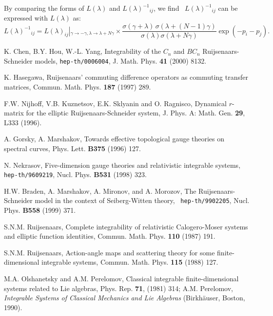 \documentclass[a4paper,12pt]{article}
\begin{document}
By comparing the forms of $L(\lambda )$ and $L(\lambda
)^{-1}{}_{ij}$, we find \ $L(\lambda )^{-1}{}_{ij}$ can be
expressed with $L(\lambda )$ as:
\begin{equation}
L(\lambda )^{-1}{}_{ij}=L(\lambda )_{ij}\left|{}_{\gamma
\rightarrow -\gamma ,\lambda \rightarrow \lambda
+N\gamma}\right. \times \frac{\sigma (\gamma +\lambda
)\,\sigma (\lambda +(N-1)\gamma )}{\sigma (\lambda )\sigma
(\lambda +N\gamma )}\mathrm{\exp }(-p_{i}-p_{j}).
\label{Inll}
\end{equation}

\vspace{1pt}

\begin{thebibliography}{99}
	 K. Chen, B.Y. Hou, W.-L. Yang, Integrability of the $C_{n}$
and $BC_{n}$ Ruijsenaars-Schneider models,
\texttt{hep-th/0006004}, J. Math. Phys. \textbf{41} (2000) 8132.

  K. Hasegawa, Ruijsenaars' commuting difference operators as
commuting transfer matrices, Commun. Math. Phys.
\textbf{187} (1997) 289.

	F.W. Nijhoff, V.B. Kuznetsov, E.K. Sklyanin and O. Ragnisco,
Dynamical $r$-matrix for the elliptic Ruijsenaars-Schneider
system, J. Phys. A: Math. Gen. \textbf{29}, L333 (1996).

  A. Gorsky, A. Marshakov, Towards effective topological gauge
theories on spectral curves, Phys. Lett. \textbf{B375} (1996) 127.

  N. Nekrasov, Five-dimension gauge theories and relativistic
integrable systems, \texttt{hep-th/9609219}, Nucl. Phys.
\textbf{B531} (1998) 323.

  H.W. Braden, A. Marshakov, A. Mironov, and A. Morozov, The
Ruijsenaars-Schneider model in the context of Seiberg-Witten
theory, \texttt{ hep-th/9902205}, Nucl. Phys. \textbf{B558} (1999) 371.

  S.N.M. Ruijsenaars, Complete integrability of relativistic
Calogero-Moser systems and elliptic function identities,
Commun. Math. Phys. \textbf{110} (1987) 191.


  S.N.M. Ruijsenaars, Action-angle maps and scattering theory
for some finite-dimensional integrable systems, Commun.
Math. Phys. \textbf{ 115} (1988) 127.

  M.A. Olshanetsky and A.M. Perelomov, Classical integrable
finite-dimensional systems related to Lie algebras, Phys.
Rep. \textbf{71}, (1981) 314; A.M. Perelomov,
\textit{Integrable Systems of Classical Mechanics
and Lie Algebras} (Birkh\"{a}user, Boston, 1990).


\end{thebibliography}
\end{document}
